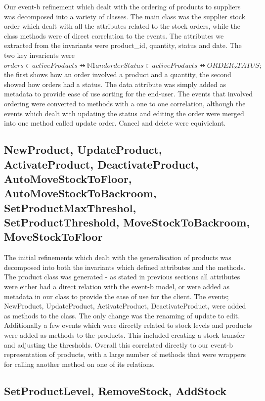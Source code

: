 \documentclass[a4paper]{article}
\begin{document}
Our event-b refinement which dealt with the ordering of products to suppliers was decomposed into a variety of classes. The main class was the supplier stock order which dealt with all the attributes related to the stock orders, while the class methods were of direct correlation to the events. The attributes we extracted from the invariants were product\_id, quantity, status and date. The two key invarients were \(orders ∈ activeProducts ⇸ ℕ1 and orderStatus ∈ activeProducts ⇸ ORDER_STATUS; \) the first shows how an order involved a product and a quantity, the second showed how orders had a status. The data attribute was simply added as metadata to provide ease of use sorting for the end-user. The events that involved ordering were converted to methods with a one to one correlation, although the events which dealt with updating the status and editing the order were merged into one method called update order. Cancel and delete were equivielant.

\subsection{NewProduct, UpdateProduct, ActivateProduct, DeactivateProduct, AutoMoveStockToFloor, AutoMoveStockToBackroom, SetProductMaxThreshol, SetProductThreshold, MoveStockToBackroom, MoveStockToFloor}

The initial refinements which dealt with the generalisation of products was decomposed into both the invariants which defined attributes and the methods. The product class was generated - as stated in previous sections all attributes were either had a direct relation with the event-b model, or were added as metadata in our class to provide the ease of use for the client. The events; NewProduct, UpdateProduct, ActivateProduct, DeactivateProduct, were added as methods to the class. The only change was the renaming of update to edit. Additionally a few events which were directly related to stock levels and products were added as methods to the products. This included creating a stock transfer and adjusting the thresholds. Overall this correlated directly to our event-b representation of products, with a large number of methods that were wrappers for calling another method on one of its relations.


\subsection{SetProductLevel, RemoveStock, AddStock}
\end{document}
